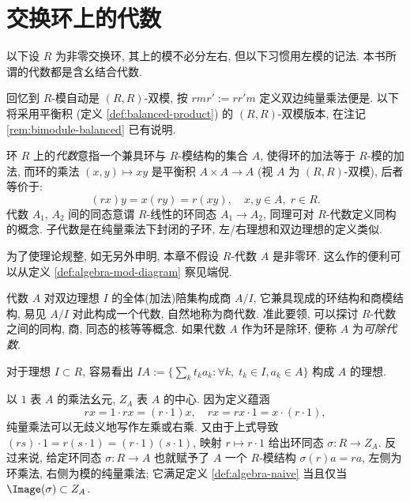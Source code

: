 \section{交换环上的代数}\label{sec:algebra-def}
以下设 $R$ 为非零交换环, 其上的模不必分左右, 但以下习惯用左模的记法. 本书所谓的代数都是含幺结合代数.

回忆到 $R$-模自动是 $(R,R)$-双模, 按 $rmr' := rr'm$ 定义双边纯量乘法便是. 以下将采用平衡积 (定义 \ref{def:balanced-product}) 的 $(R,R)$-双模版本, 在注记 \ref{rem:bimodule-balanced} 已有说明.

\begin{definition}\label{def:algebra-naive}
	环 $R$ 上的\emph{代数}意指一个兼具环与 $R$-模结构的集合 $A$, 使得环的加法等于 $R$-模的加法, 而环的乘法 $(x,y) \mapsto xy$ 是平衡积 $A \times A \to A$ (视 $A$ 为 $(R,R)$-双模), 后者等价于:
	\[ (rx)y = x(ry) = r(xy), \quad x,y \in A, \; r \in R. \]
	代数 $A_1$, $A_2$ 间的同态意谓 $R$-线性的环同态 $A_1 \to A_2$, 同理可对 $R$-代数定义同构的概念. 子代数是在纯量乘法下封闭的子环, 左/右理想和双边理想的定义类似.
\end{definition}

\begin{convention}
	为了使理论规整, 如无另外申明, 本章不假设 $R$-代数 $A$ 是非零环. 这么作的便利可以从定义 \ref{def:algebra-mod-diagram} 察见端倪.
\end{convention}

代数 $A$ 对双边理想 $I$ 的全体(加法)陪集构成商 $A/I$, 它兼具现成的环结构和商模结构, 易见 $A/I$ 对此构成一个代数, 自然地称为商代数. 准此要领, 可以探讨 $R$-代数之间的同构, 商, 同态的核等等概念. 如果代数 $A$ 作为环是除环, 便称 $A$ 为\emph{可除代数}. 

对于理想 $I \subset R$, 容易看出 $IA := \{ \sum_k t_k a_k : \forall k, \; t_k \in I, a_k \in A\}$ 构成 $A$ 的理想.

以 $1$ 表 $A$ 的乘法幺元, $Z_A$ 表 $A$ 的中心. 因为定义蕴涵
\[ rx = 1 \cdot rx = (r \cdot 1)x, \quad rx = rx \cdot 1 = x \cdot (r \cdot 1), \]
纯量乘法可以无歧义地写作左乘或右乘. 又由于上式导致 $(rs) \cdot 1 = r(s \cdot 1) = (r \cdot 1) (s \cdot 1)$, 映射 $r \mapsto r \cdot 1$ 给出环同态 $\sigma: R \to Z_A$. 反过来说, 给定环同态 $\sigma: R \to A$ 也就赋予了 $A$ 一个 $R$-模结构 $\sigma(r)a = ra$, 左侧为环乘法, 右侧为模的纯量乘法; 它满足定义 \ref{def:algebra-naive} 当且仅当 $\Image(\sigma) \subset Z_A$.

